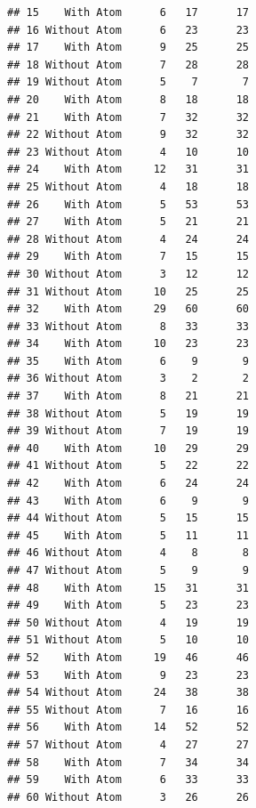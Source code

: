 \documentclass[]{article}
\begin{document}
\begin{verbatim}
## 15    With Atom      6   17      17
## 16 Without Atom      6   23      23
## 17    With Atom      9   25      25
## 18 Without Atom      7   28      28
## 19 Without Atom      5    7       7
## 20    With Atom      8   18      18
## 21    With Atom      7   32      32
## 22 Without Atom      9   32      32
## 23 Without Atom      4   10      10
## 24    With Atom     12   31      31
## 25 Without Atom      4   18      18
## 26    With Atom      5   53      53
## 27    With Atom      5   21      21
## 28 Without Atom      4   24      24
## 29    With Atom      7   15      15
## 30 Without Atom      3   12      12
## 31 Without Atom     10   25      25
## 32    With Atom     29   60      60
## 33 Without Atom      8   33      33
## 34    With Atom     10   23      23
## 35    With Atom      6    9       9
## 36 Without Atom      3    2       2
## 37    With Atom      8   21      21
## 38 Without Atom      5   19      19
## 39 Without Atom      7   19      19
## 40    With Atom     10   29      29
## 41 Without Atom      5   22      22
## 42    With Atom      6   24      24
## 43    With Atom      6    9       9
## 44 Without Atom      5   15      15
## 45    With Atom      5   11      11
## 46 Without Atom      4    8       8
## 47 Without Atom      5    9       9
## 48    With Atom     15   31      31
## 49    With Atom      5   23      23
## 50 Without Atom      4   19      19
## 51 Without Atom      5   10      10
## 52    With Atom     19   46      46
## 53    With Atom      9   23      23
## 54 Without Atom     24   38      38
## 55 Without Atom      7   16      16
## 56    With Atom     14   52      52
## 57 Without Atom      4   27      27
## 58    With Atom      7   34      34
## 59    With Atom      6   33      33
## 60 Without Atom      3   26      26
\end{verbatim}
\end{document}
